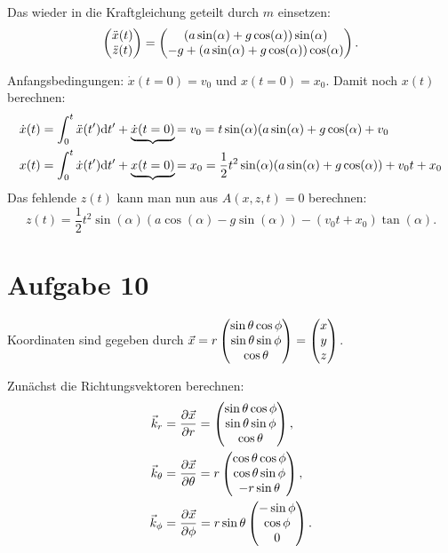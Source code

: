 Das wieder in die Kraftgleichung geteilt durch $m$ einsetzen:
\[
	\begin{pmatrix} \ddot{x}(t) \\ \ddot{z}(t) \end{pmatrix} 
	= \begin{pmatrix}  (a \sin(\alpha) + g \cos(\alpha)) \sin(\alpha) \\ - g + (a \sin(\alpha) + g \cos(\alpha)) \cos(\alpha) \end{pmatrix}
	\text{.}
\]

Anfangsbedingungen: $\dot{x}(t = 0) = v_0$ und $x(t = 0) = x_0$. Damit noch $x(t)$ berechnen: 
\begin{align*}
	\dot{x}(t) 
	&= \int_0^t \ddot{x}(t') \mathrm{d} t' + \underbrace{\dot{x}(t = 0)}{= v_0}
	= t \sin(\alpha) (a \sin(\alpha) + g \cos(\alpha) + v_0 \\
	x(t)
	&= \int_0^t \dot{x}(t') \mathrm{d} t' + \underbrace{x(t = 0)}{= x_0}
	= \frac{1}{2} t^2 \sin(\alpha) (a \sin(\alpha) + g \cos(\alpha)) + v_0 t + x_0
\end{align*}
Das fehlende $z(t)$ kann man nun aus $A(x, z, t) = 0$ berechnen:
\[
	z(t) = \frac{1}{2} t^2 \sin(\alpha) (a \cos(\alpha) - g \sin(\alpha)) - (v_0 t + x_0) \tan(\alpha)
	\text{.}
\]

\section*{Aufgabe 10}

Koordinaten sind gegeben durch $\vec{x} = r \begin{pmatrix} \sin \theta \cos \phi \\ \sin \theta \sin \phi \\ \cos \theta \end{pmatrix} = \begin{pmatrix} x \\ y \\ z \end{pmatrix}$.

Zunächst die Richtungsvektoren berechnen: 
\begin{align*}
	\vec{k}_r &= \frac{\partial \vec{x}}{\partial r} = \begin{pmatrix}  \sin \theta \cos \phi \\ \sin \theta \sin \phi \\ \cos \theta \end{pmatrix}, \\
	\vec{k}_\theta &= \frac{\partial \vec{x}}{\partial \theta} = r \begin{pmatrix} \cos \theta \cos \phi \\ \cos \theta \sin \phi \\ -r \sin \theta \end{pmatrix}, \\
	\vec{k}_\phi &= \frac{\partial \vec{x}}{\partial \phi} = r \sin \theta \begin{pmatrix}  - \sin \phi \\ \cos \phi \\ 0 \end{pmatrix}
	\text{.}
\end{align*}

